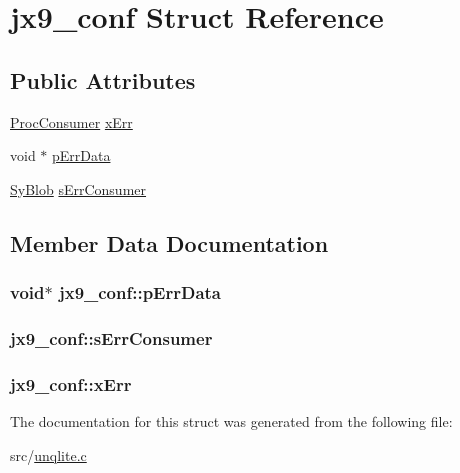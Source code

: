 \hypertarget{structjx9__conf}{\section{jx9\-\_\-conf Struct Reference}
\label{dc/d14/structjx9__conf}
}
\subsection*{Public Attributes}
\begin{DoxyCompactItemize}
\item 
\hyperlink{unqlite_8h_a23e329c5ae3c9a3233492de42393c93c}{Proc\-Consumer} \hyperlink{structjx9__conf_adb1ae34fd0bb02ff77bcb93f88a8b18c}{x\-Err}
\item 
void $\ast$ \hyperlink{structjx9__conf_af87111c50ff39e1c1078dcd7fead538c}{p\-Err\-Data}
\item 
\hyperlink{struct_sy_blob}{Sy\-Blob} \hyperlink{structjx9__conf_ab35d98abef33ebb7fe4aa6c36801c657}{s\-Err\-Consumer}
\end{DoxyCompactItemize}


\subsection{Member Data Documentation}
\hypertarget{structjx9__conf_af87111c50ff39e1c1078dcd7fead538c}{
\subsubsection[{p\-Err\-Data}]{\setlength{\rightskip}{0pt plus 5cm}void$\ast$ jx9\-\_\-conf\-::p\-Err\-Data}}\label{dc/d14/structjx9__conf_af87111c50ff39e1c1078dcd7fead538c}
\hypertarget{structjx9__conf_ab35d98abef33ebb7fe4aa6c36801c657}{
\subsubsection[{s\-Err\-Consumer}]{ jx9\-\_\-conf\-::s\-Err\-Consumer}}\label{dc/d14/structjx9__conf_ab35d98abef33ebb7fe4aa6c36801c657}
\hypertarget{structjx9__conf_adb1ae34fd0bb02ff77bcb93f88a8b18c}{
\subsubsection[{x\-Err}]{ jx9\-\_\-conf\-::x\-Err}}\label{dc/d14/structjx9__conf_adb1ae34fd0bb02ff77bcb93f88a8b18c}


The documentation for this struct was generated from the following file\-:\begin{DoxyCompactItemize}
\item 
src/\hyperlink{unqlite_8c}{unqlite.\-c}\end{DoxyCompactItemize}
